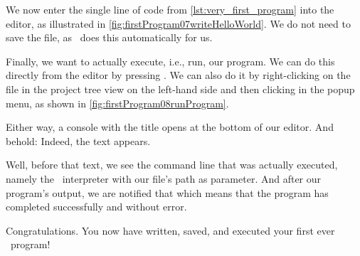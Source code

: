 We now enter the single line of code from \cref{lst:very_first_program} into the editor, as illustrated in \cref{fig:firstProgram07writeHelloWorld}.
We do not need to save the file, as \pycharm\ does this automatically for us.

Finally, we want to actually execute, i.e., run, our program.
We can do this directly from the editor by pressing .
We can also do it by right-clicking on the file in the project tree view on the left-hand side and then clicking  in the popup menu, as shown in \cref{fig:firstProgram08runProgram}.

Either way, a console with the title  opens at the bottom of our editor.
And behold:
Indeed, the text  appears.

Well, before that text, we see the command line that was actually executed, namely the \python\ interpreter with our file's path as parameter.
And after our program's output, we are notified that  which means that the program has completed successfully and without error.

Congratulations.
You now have written, saved, and executed your first ever \python\ program!%
%
\endhsection%
%

